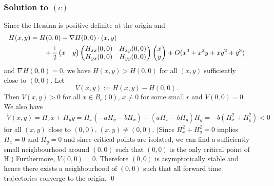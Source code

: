 \subsubsection*{Solution to $(c)$}
Since the Hessian is positive definite at the origin and
\begin{align*}
H(x, y) &= H(0, 0) + \nabla H(0, 0) \cdot (x, y)\\
&\quad\quad+ \frac{1}{2}\begin{pmatrix}  x & y \end{pmatrix}\begin{pmatrix}H_{xx}(0, 0) & H_{xy}(0, 0)\\H_{yx}(0, 0) & H_{yy}(0, 0)\end{pmatrix}\begin{pmatrix} x \\ y\end{pmatrix} + O(x^{3} + x^{2}y + xy^{2} + y^{3})
\end{align*}
and $\nabla H(0, 0) = 0$, we have $H(x, y) > H(0, 0)$ for all $(x, y)$ sufficiently close to $(0, 0)$. Let
$$V(x, y) := H(x, y) - H(0, 0).$$ Then $V(x, y) > 0$ for all $x \in B_{r}(0)$, $x \neq 0$ for some small $r$
and $V(0, 0) = 0$. We also have
\begin{align*}
\dot{V}(x, y) = H_{x}\dot{x} + H_{y}\dot{y} = H_{x}(-aH_{y} - bH_{x}) + (aH_{x} - bH_{y})H_{y} = -b(H_{x}^{2} + H_{y}^{2}) < 0
\end{align*}
for all $(x, y)$ close to $(0, 0)$, $(x, y) \neq (0, 0)$. (Since $H_{x}^{2} + H_{y}^{2} = 0$
implies $H_{x} = 0$ and $H_{y} = 0$ and since critical points are isolated, we can find a sufficiently small
neighbourhood around $(0, 0)$ such that $(0, 0)$ is the only critical point of H.)
Furthermore, $\dot{V}(0, 0) = 0$. Therefore $(0, 0)$ is asymptotically stable and hence
there exists a neighbourhood of $(0, 0)$ such that all forward time trajectories converge to the origin.
\hfill\qed
